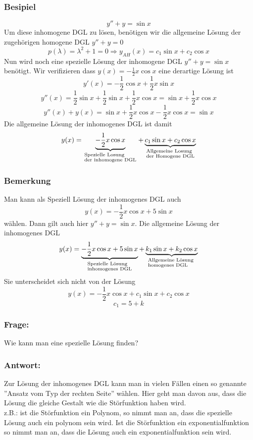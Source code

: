 \subsubsection*{Besipiel}
$$y''+y=\sin x$$
Um diese inhomogene DGL zu lösen, benötigen wir die allgemeine Lösung der zugehörigen homogene DGL $y''+y=0$$$p(\lambda)=\lambda^2+1=0\Rightarrow y_{AH}(x)=c_1\sin x+c_2\cos x$$ Nun wird noch eine spezielle Lösung der inhomogene DGL $y''+y=\sin x$ benötigt. Wir verifizieren dass $y(x)=-\frac{1}{2}x\cos x$ eine derartige Lösung ist
$$y'(x)=-\frac{1}{2}\cos x+\frac{1}{2}x\sin x$$
$$y''(x)=\frac{1}{2}\sin x+\frac{1}{2}\sin x+\frac{1}{2}x\cos x=\sin x+\frac{1}{2}x\cos x$$
$$y''(x)+y(x)=\sin x+\frac{1}{2}x\cos x-\frac{1}{2}x\cos x=\sin x$$ Die allgemeine Lösung der inhomogenes DGL ist damit $$y(x) = \underbrace { - \frac{1}{2}x\cos x}_{\scriptstyle{\text{Spezielle Losung }}\hfill\atop
\scriptstyle{\text{der inhomogene DGL}}\hfill} + \underbrace {{c_1}\sin x + {c_2}\cos x}_{\scriptstyle{\text{Allgemeine Losung }}\hfill\atop
\scriptstyle{\text{der Homogene DGL}}\hfill}$$
\subsubsection*{Bemerkung}
Man kann als Speziell Lösung der inhomogenes DGL auch $$y(x)=-\frac{1}{2}x\cos x+5\sin x$$ wählen. Dann gilt auch hier $y''+y=\sin x$. Die allgemeine Lösung der inhomogenes DGL 
$$y(x) = \underbrace { - \frac{1}{2}x\cos x + 5\sin x}_{\scriptstyle{\text{Spezielle Lösung }}\hfill\atop
\scriptstyle{\text{inhomogenes DGL}}\hfill} + \underbrace {{k_1}\sin x + {k_2}\cos x}_{\scriptstyle{\text{Allgemeine Lösung }}\hfill\atop
\scriptstyle{\text{homogenes DGL}}\hfill}$$ Sie unterscheidet sich nicht von der Lösung $$y(x)=-\frac{1}{2}x\cos x+c_1\sin x+c_2\cos x$$$$c_1=5+k$$
\subsubsection*{Frage:}
Wie kann man eine spezielle Lösung finden?
\subsubsection*{Antwort:}
Zur Lösung der inhomogenes DGL kann man in vielen Fällen einen so genannte ''Ansatz vom Typ der rechten Seite'' wählen. Hier geht man davon aus, dass die Lösung die gleiche Gestalt wie die Störfunktion haben wird.\\

\noindent z.B.: ist die Störfunktion ein Polynom, so nimmt man an, dass die spezielle Lösung auch ein polynom sein wird. Ist die Störfunktion ein exponentialfunktion so nimmt man an, dass die Lösung auch ein exponentialfunktion sein wird.

